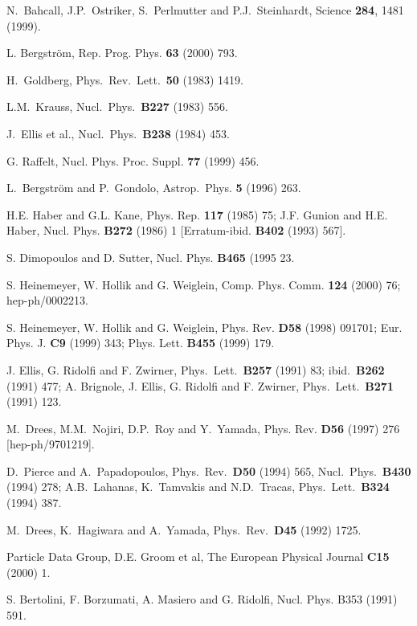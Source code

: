 \begin{thebibliography}{99}
N.~Bahcall, J.P.~Ostriker, S.~Perlmutter and P.J.~Steinhardt,
Science {\bf 284}, 1481 (1999).

 L. Bergstr\"om, Rep. Prog. Phys. {\bf 63} (2000) 793.

 H.~Goldberg, Phys.\ Rev.\ Lett.\ {\bf 50} (1983)
1419.

L.M.~Krauss, Nucl.\ Phys.\ {\bf B227} (1983) 556.

 J.~Ellis et al., Nucl.\ Phys.\ {\bf B238}
   (1984) 453.

 G. Raffelt, Nucl. Phys. Proc. Suppl. {\bf 77} (1999)
456.

 L.~Bergstr{\"o}m and P.~Gondolo, Astrop.\ Phys. {\bf 5}
(1996) 263.

H.E. Haber and G.L. Kane, Phys. Rep. {\bf 117} (1985) 75;
J.F. Gunion and H.E. Haber, Nucl. Phys. {\bf B272} (1986) 1 [Erratum-ibid.
{\bf B402} (1993) 567].

 S. Dimopoulos and D. Sutter, Nucl. Phys.
{\bf B465} (1995 23.

 S. Heinemeyer, W. Hollik and G. Weiglein,
     Comp. Phys. Comm. {\bf 124} (2000) 76; hep-ph/0002213.

 S. Heinemeyer, W. Hollik and G. Weiglein, Phys.
Rev.  {\bf D58} (1998) 091701; Eur.  Phys.  J. {\bf C9} (1999) 343;
Phys.  Lett.  {\bf B455} (1999) 179.

 J. Ellis, G. Ridolfi and F. Zwirner, Phys.\ Lett.\ {\bf B257}
   (1991) 83; ibid.\ {\bf B262} (1991) 477;
  A. Brignole, J. Ellis, G. Ridolfi and F. Zwirner, Phys.\
   Lett.\ {\bf B271} (1991) 123.

M.~Drees, M.M.~Nojiri, D.P.~Roy and Y.~Yamada, Phys. Rev. {\bf D56} (1997)
276 [hep-ph/9701219].

D.~Pierce and A.~Papadopoulos, Phys.\ Rev.\ {\bf D50} (1994) 565,
Nucl.\ Phys.\ {\bf B430} (1994) 278; A.B.~Lahanas, K.~Tamvakis and
N.D.~Tracas, Phys.\ Lett.\ {\bf B324} (1994) 387.

M.~Drees, K.~Hagiwara and A.~Yamada, Phys.\ Rev.\ {\bf D45} (1992)
1725.

 Particle Data Group,
D.E. Groom et al, The European Physical Journal {\bf C15} (2000) 1.

S. Bertolini, F. Borzumati, A. Masiero and G. Ridolfi,
Nucl. Phys. B353 (1991) 591.


\end{thebibliography}
